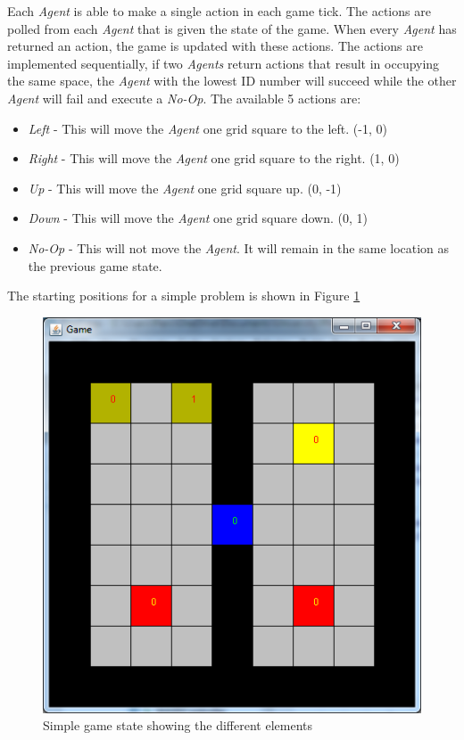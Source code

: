 \documentclass{IEEEtran}
\begin{document}
Each \emph{Agent} is able to make a single action in each game tick. The actions are polled from each \emph{Agent} that is given the state of the game. When every \emph{Agent} has returned an action, the game is updated with these actions. The actions are implemented sequentially, if two \emph{Agents} return actions that result in occupying the same space, the \emph{Agent} with the lowest ID number will succeed while the other \emph{Agent} will fail and execute a \emph{No-Op}. The available 5 actions are:
\begin{itemize}
\item{\emph{Left} - This will move the \emph{Agent} one grid square to the left. (-1, 0)}
\item{\emph{Right} - This will move the \emph{Agent} one grid square to the right. (1, 0)}
\item{\emph{Up} - This will move the \emph{Agent} one grid square up. (0, -1)}
\item{\emph{Down} - This will move the \emph{Agent} one grid square down. (0, 1)}
\item{\emph{No-Op} - This will not move the \emph{Agent}. It will remain in the same location as the previous game state.}
\end{itemize}

The starting positions for a simple problem is shown in Figure \ref{InitialState}
\begin{figure}[ht]
\centering
\includegraphics[scale=0.5]{InitialState}
\caption{Simple game state showing the different elements\protect\footnotemark }
\label{InitialState}
\end{figure}
\end{document}
